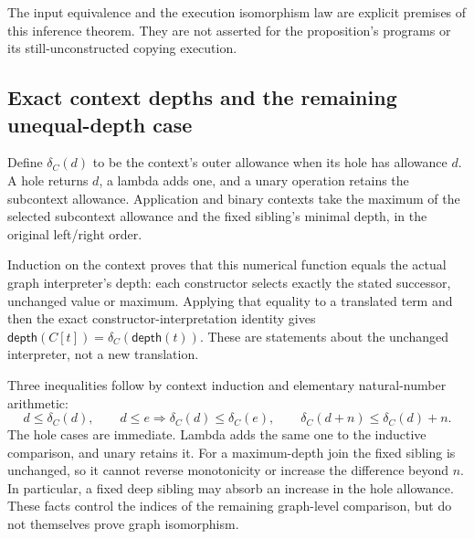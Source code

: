 The input equivalence and the execution isomorphism law are explicit premises
of this inference theorem. They are not asserted for the proposition's programs
or its still-unconstructed copying execution.



\subsection{Exact context depths and the remaining unequal-depth case}

Define $\delta_C(d)$ to be the context's outer allowance when its hole has
allowance $d$. A hole returns $d$, a lambda adds one, and a unary operation
retains the subcontext allowance. Application and binary contexts take the
maximum of the selected subcontext allowance and the fixed sibling's minimal
depth, in the original left/right order.

Induction on the context proves that this numerical function equals the
actual graph interpreter's depth: each constructor selects exactly the stated
successor, unchanged value or maximum. Applying that equality to a translated
term and then the exact constructor-interpretation identity gives
$\mathsf{depth}(C[t])=\delta_C(\mathsf{depth}(t))$.
These are statements about the unchanged interpreter, not a new translation.





Three inequalities follow by context induction and elementary natural-number
arithmetic:
\[
 d\leq\delta_C(d),\qquad
 d\leq e\Longrightarrow\delta_C(d)\leq\delta_C(e),\qquad
 \delta_C(d+n)\leq\delta_C(d)+n.
\]
The hole cases are immediate. Lambda adds the same one to the inductive
comparison, and unary retains it. For a maximum-depth join the fixed sibling
is unchanged, so it cannot reverse monotonicity or increase the difference
beyond $n$. In particular, a fixed deep sibling may absorb an increase in the
hole allowance. These facts control the indices of the remaining graph-level
comparison, but do not themselves prove graph isomorphism.



